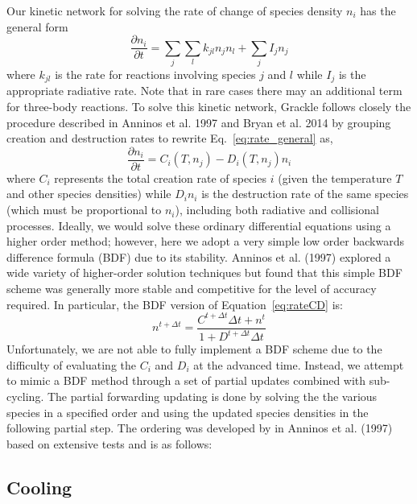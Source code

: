 Our kinetic network for solving the rate of change of species density $n_i$ has the general form
\begin{equation}
\frac{\partial n_i}{\partial t} = \sum_j \sum_l k_{jl} n_j n_l + \sum_j I_j n_j
\label{eq:rate_general}
\end{equation}
where $k_{jl}$ is the rate for reactions involving species $j$ and $l$ while $I_j$ is the appropriate radiative rate.  Note that in rare cases there may an additional term for three-body reactions.   To solve this kinetic network, Grackle follows closely the procedure described in Anninos et al. 1997 and Bryan et al. 2014 by grouping creation and destruction rates to rewrite Eq.~\ref{eq:rate_general} as,
\begin{equation}
\frac{\partial n_i}{\partial t} = C_i(T, n_j) - D_i(T, n_j) n_i
\label{eq:rateCD}
\end{equation}
where $C_i$ represents the total creation rate of species $i$ (given the temperature $T$ and other species densities) while $D_i n_i$ is the destruction rate of the same species (which must be proportional to $n_i$), including both radiative and collisional processes.  Ideally, we would solve these ordinary differential equations using a higher order method; however, here we adopt a very simple low order backwards difference formula (BDF) due to its stability.  Anninos et al. (1997) explored a wide variety of higher-order solution techniques but found that this simple BDF scheme was generally more stable and competitive for the level of accuracy required.  In particular, the BDF version of Equation~\ref{eq:rateCD} is:
\begin{equation}
n^{t + \Delta t} = \frac{C^{t+\Delta t} \Delta t + n^t}{1 + D^{t+\Delta t} \Delta t}
\label{eq:rate_BDF}
\end{equation}
Unfortunately, we are not able to fully implement a BDF scheme due to the difficulty of evaluating the $C_i$ and $D_i$ at the advanced time.  Instead, we attempt to mimic a BDF method through a set of partial updates combined with sub-cycling.  The partial forwarding updating is done by solving the the various species in a specified order and using the updated species densities in the following partial step.  The ordering was developed by in Anninos et al. (1997) based on extensive tests and is as follows:



\subsection{Cooling} \label{Cooling}


